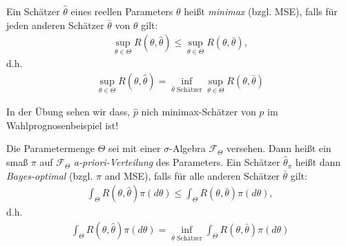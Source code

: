 \documentclass[a4paper]{scrartcl}
\begin{document}
		\begin{definition}
			Ein Schätzer $\hat{\theta}$ eines reellen Parameters $\theta$ heißt \emph{minimax} (bzgl. MSE), falls für jeden anderen Schätzer $\bar{\theta}$ von $\theta$ gilt:
			\begin{align*}
				\sup_{\theta\in\Theta}R(\theta,\hat{\theta})\le\sup_{\theta\in\Theta}R(\theta,\bar{\theta}),
			\end{align*}
			d.h.
			\begin{align*}
				\sup_{\theta\in\Theta}R(\theta,\hat{\theta})=\inf_{\bar{\theta}\text{ Schätzer}}\sup_{\theta\in\Theta}R(\theta,\bar{\theta})
			\end{align*}
		\end{definition}
		\begin{example}
			In der Übung sehen wir dass, $\hat{p}$ nich minimax-Schätzer von $p$ im Wahlprognosenbeispiel ist!
		\end{example}
		\begin{definition}
			Die Parametermenge $\Theta$ sei mit einer $\sigma$-Algebra $\mathscr{F}_\Theta$ versehen. Dann heißt ein \Wk smaß $\pi$ auf $\mathscr{F}_\Theta$ \emph{a-priori-Verteilung} des Parameters. Ein Schätzer $\hat{\theta}_\pi$ heißt dann \emph{Bayes-optimal} (bzgl. $\pi$ and MSE), falls für alle anderen Schätzer $\bar{\theta}$ gilt:
			\begin{align*}
				\int_\Theta R(\theta,\hat{\theta})\pi(d\theta)\le \int_\Theta R(\theta,\bar{\theta})\pi(d\theta),
			\end{align*}
			d.h.
			\begin{align*}
				\int_\Theta R(\theta,\hat{\theta})\pi(d\theta)=\inf_{\bar{\theta}\text{ Schätzer}}\int_\Theta R(\theta,\bar{\theta})\pi(d\theta)
			\end{align*}
		\end{definition}
\end{document}
